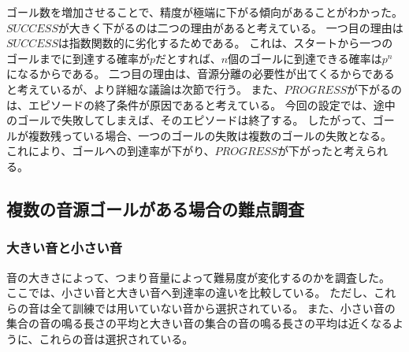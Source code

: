 ゴール数を増加させることで、精度が極端に下がる傾向があることがわかった。
$SUCCESS$が大きく下がるのは二つの理由があると考えている。
一つ目の理由は$SUCCESS$は指数関数的に劣化するためである。
これは、スタートから一つのゴールまでに到達する確率が$p$だとすれば、$n$個のゴールに到達できる確率は$p^n$になるからである。
二つ目の理由は、音源分離の必要性が出てくるからであると考えているが、より詳細な議論は次節で行う。
また、$PROGRESS$が下がるのは、エピソードの終了条件が原因であると考えている。
今回の設定では、途中のゴールで失敗してしまえば、そのエピソードは終了する。
したがって、ゴールが複数残っている場合、一つのゴールの失敗は複数のゴールの失敗となる。
これにより、ゴールへの到達率が下がり、$PROGRESS$が下がったと考えられる。


\subsection{複数の音源ゴールがある場合の難点調査}


\subsubsection{大きい音と小さい音}
  

音の大きさによって、つまり音量によって難易度が変化するのかを調査した。
ここでは、小さい音と大きい音へ到達率の違いを比較している。
ただし、これらの音は全て訓練では用いていない音から選択されている。
また、小さい音の集合の音の鳴る長さの平均と大きい音の集合の音の鳴る長さの平均は近くなるように、これらの音は選択されている。

